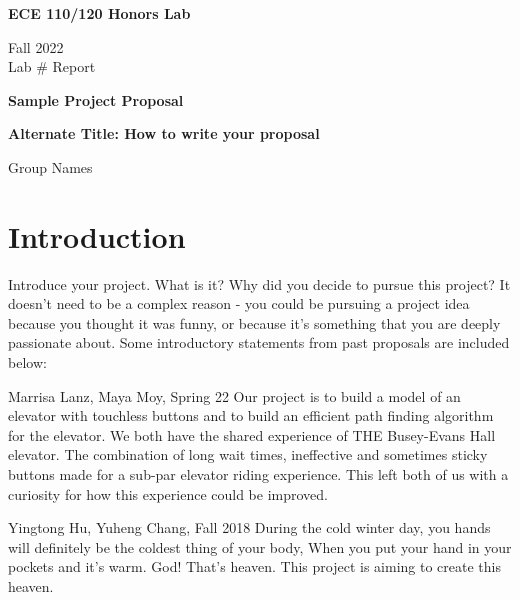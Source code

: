 \documentclass{article}
\begin{document}
\begin{titlepage}
   \begin{center}


       \huge{\textbf{ECE 110/120 Honors Lab}}

       \vspace{0.5cm}
        \Large{Fall 2022}\\
        \normalsize{Lab \# Report}
            
       \vfill

       \Huge{\textbf{Sample Project Proposal}}
	\vspace{2mm}

       \Large{\textbf{Alternate Title: How to write your proposal}}

       \vfill
        
       \normalsize{Group Names}\\
       
            
   \end{center}
\end{titlepage}

\section{Introduction}

Introduce your project. What is it? Why did you decide to pursue this project? It doesn't need to be a complex reason - you could be pursuing a project idea because you thought it was funny, or because it's something that you are deeply passionate about. Some introductory statements from past proposals are included below:

\begin{pquotation}{Marrisa Lanz, Maya Moy, Spring 22}
Our project is to build a model of an elevator with touchless buttons and to build an efficient path finding algorithm for the elevator. We both have the shared experience of THE Busey-Evans Hall elevator. The combination of long wait times, ineffective and sometimes sticky buttons made for a sub-par elevator riding experience. This left both of us with a curiosity for how this experience could be improved. 
\end{pquotation}

\vspace{3mm}

\begin{pquotation}{Yingtong Hu, Yuheng Chang, Fall 2018}
 During the cold winter day, you hands will definitely be the coldest thing of your body, When you put your hand in your pockets and it's warm. God! That's heaven. This project is aiming to create this heaven.
\end{pquotation}
\end{document}
